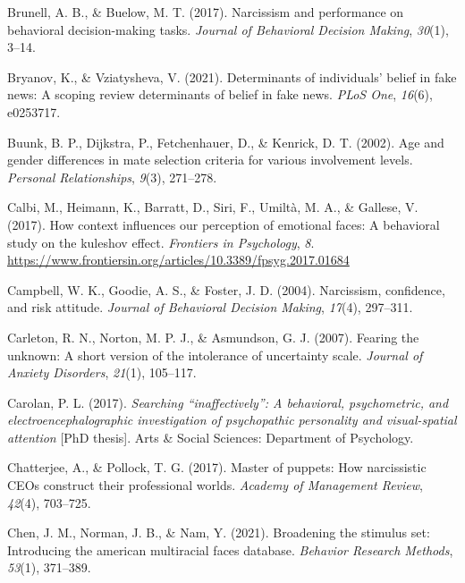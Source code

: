 \documentclass[
  man,floatsintext]{apa6}
\newlength{\cslhangindent}
\newlength{\cslentryspacingunit} %
\newenvironment{CSLReferences}[2] %
 {%
  \setlength{\parindent}{0pt}
  \ifodd #1
  \let\oldpar\par
  \def\par{\hangindent=\cslhangindent\oldpar}
  \fi
  \setlength{\parskip}{#2\cslentryspacingunit}
 }%
 {}
\begin{document}
\begin{CSLReferences}{1}{0}
\leavevmode{}%
Brunell, A. B., \& Buelow, M. T. (2017). Narcissism and performance on behavioral decision-making tasks. \emph{Journal of Behavioral Decision Making}, \emph{30}(1), 3--14.

\leavevmode{}%
Bryanov, K., \& Vziatysheva, V. (2021). Determinants of individuals' belief in fake news: A scoping review determinants of belief in fake news. \emph{PLoS One}, \emph{16}(6), e0253717.

\leavevmode{}%
Buunk, B. P., Dijkstra, P., Fetchenhauer, D., \& Kenrick, D. T. (2002). Age and gender differences in mate selection criteria for various involvement levels. \emph{Personal Relationships}, \emph{9}(3), 271--278.

\leavevmode{}%
Calbi, M., Heimann, K., Barratt, D., Siri, F., Umiltà, M. A., \& Gallese, V. (2017). How context influences our perception of emotional faces: A behavioral study on the kuleshov effect. \emph{Frontiers in Psychology}, \emph{8}. \url{https://www.frontiersin.org/articles/10.3389/fpsyg.2017.01684}

\leavevmode{}%
Campbell, W. K., Goodie, A. S., \& Foster, J. D. (2004). Narcissism, confidence, and risk attitude. \emph{Journal of Behavioral Decision Making}, \emph{17}(4), 297--311.

\leavevmode{}%
Carleton, R. N., Norton, M. P. J., \& Asmundson, G. J. (2007). Fearing the unknown: A short version of the intolerance of uncertainty scale. \emph{Journal of Anxiety Disorders}, \emph{21}(1), 105--117.

\leavevmode{}%
Carolan, P. L. (2017). \emph{Searching {``inaffectively''}: A behavioral, psychometric, and electroencephalographic investigation of psychopathic personality and visual-spatial attention} {[}PhD thesis{]}. Arts \& Social Sciences: Department of Psychology.

\leavevmode{}%
Chatterjee, A., \& Pollock, T. G. (2017). Master of puppets: How narcissistic CEOs construct their professional worlds. \emph{Academy of Management Review}, \emph{42}(4), 703--725.

\leavevmode{}%
Chen, J. M., Norman, J. B., \& Nam, Y. (2021). Broadening the stimulus set: Introducing the american multiracial faces database. \emph{Behavior Research Methods}, \emph{53}(1), 371--389.


\end{CSLReferences}
\end{document}

